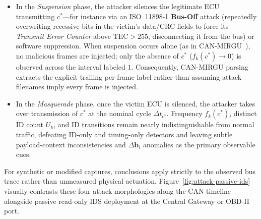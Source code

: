 \documentclass[12pt, a4paper, reqno, oneside]{book}
\begin{document}
\begin{enumerate}
    \begin{itemize}
        \item In the \textit{Suspension} phase, the attacker silences the legitimate ECU transmitting $c^*$---for instance via an ISO~11898-1 \textbf{Bus-Off} attack (repeatedly overwriting recessive bits in the victim's data/CRC fields to force its \textit{Transmit Error Counter} above $\text{TEC} > 255$, disconnecting it from the bus) or software suppression. When suspension occurs alone (as in CAN-MIRGU~\cite{rajapaksha2024canmirgu}), no malicious frames are injected; only the absence of $c^*$ ($f_k(c^*) \to 0$) is observed across the interval labeled $1$. Consequently, CAN-MIRGU parsing extracts the explicit trailing per-frame label rather than assuming attack filenames imply every frame is injected.
        \item In the \textit{Masquerade} phase, once the victim ECU is silenced, the attacker takes over transmission of $c^*$ at the nominal cycle $\Delta t_{c^*}$. Frequency $f_k(c^*)$, distinct ID count $U_k$, and ID transitions remain nearly indistinguishable from normal traffic, defeating ID-only and timing-only detectors and leaving subtle payload-context inconsistencies and $\Delta \mathbf{b}_i$ anomalies as the primary observable cues.
    \end{itemize}
\end{enumerate}

For synthetic or modified captures, conclusions apply strictly to the observed bus trace rather than unmeasured physical actuation. Figure~\ref{fig:attack-passive-ids} visually contrasts these four attack morphologies along the CAN timeline alongside passive read-only IDS deployment at the Central Gateway or OBD-II port.
\end{document}
